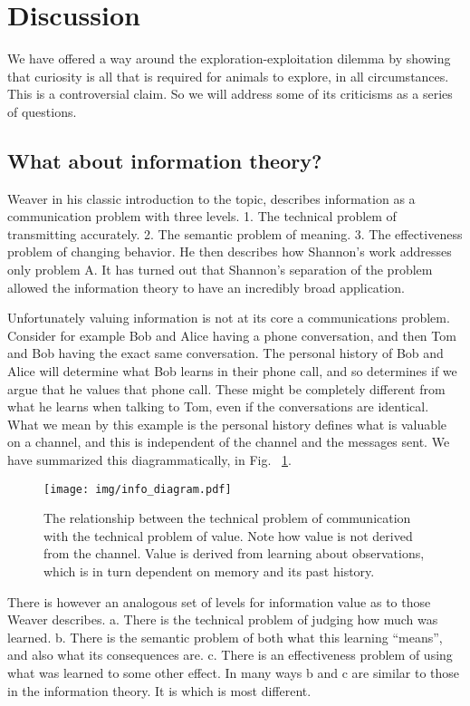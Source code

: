 \section{Discussion}
We have offered a way around the exploration-exploitation dilemma by showing that curiosity is all that is required for animals to explore, in all circumstances. This is a controversial claim. So we will address some of its criticisms as a series of questions.

\subsection*{What about information theory?}
Weaver \cite{Shannon1948} in his classic introduction to the topic, describes information as a communication problem with three levels. 1. The technical problem of transmitting accurately. 2. The semantic problem of meaning. 3. The effectiveness problem of changing behavior. He then describes how Shannon's work addresses only problem A. It has turned out that Shannon's separation of the problem allowed the information theory to have an incredibly broad application. 

Unfortunately valuing information is not at its core a communications problem. Consider for example Bob and Alice having a phone conversation, and then Tom and Bob having the exact same conversation. The personal history of Bob and Alice will determine what Bob learns in their phone call, and so determines if we argue that he values that phone call. These might be completely different from what he learns when talking to Tom, even if the conversations are identical. What we mean by this example is the personal history defines what is valuable on a channel, and this is independent of the channel and the messages sent. We have summarized this diagrammatically, in Fig. ~\ref{fig:info1}.

\begin{figure}
\begin{fullwidth}
	\texttt{[image: img/info\_diagram.pdf]} 
    \caption{The relationship between the technical problem of communication with the technical problem of value. Note how value is not derived from the channel. Value is derived from learning about observations, which is in turn dependent on memory and its past history.
    }
    \label{fig:info1} 
\end{fullwidth}
\end{figure}

There is however an analogous set of levels for information value as to those Weaver describes. a. There is the technical problem of judging how much was learned. b. There is the semantic problem of both what this learning ``means'', and also what its consequences are. c. There is an effectiveness problem of using what was learned to some other effect. In many ways b and c are similar to those in the information theory. It is which is most different. 

